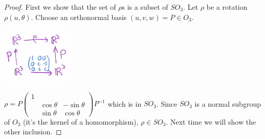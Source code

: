 \documentclass{article}
\begin{document}
\begin{proof}
First we show that the set of $\rho$s is a subset of $SO_3$. Let $\rho$ be a rotation $\rho(u,\theta)$. Choose an orthonormal basis $(u,v,w)=P\in O_3$.
    \begin{center}
        \includegraphics[width=0.25\textwidth]{Image 3 9252020.PNG}
    \end{center}
    $\rho=P\begin{pmatrix}
1&&\\&\cos\theta&-\sin\theta\\&\sin\theta&\cos\theta
\end{pmatrix}P^{-1}$ which is in $SO_3$. Since $SO_3$ is a normal subgroup of $O_3$ (it's the kernel of a homomorphism), $\rho\in SO_3$. Next time we will show the other inclusion.
\end{proof}
\end{document}
